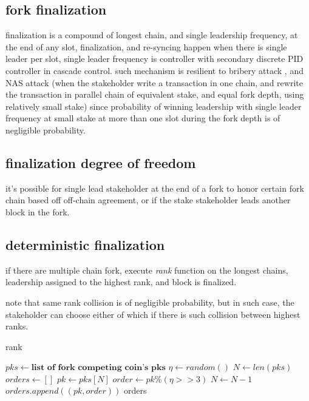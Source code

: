 \documentclass{article}
\begin{document}
\subsection{fork finalization}
finalization is a compound of longest chain, and single leadership frequency, at the end of any slot, finalization, and re-syncing happen when there is single leader per slot, single leader frequency is controller with secondary discrete PID controller in cascade control.
such mechanism is resilient to bribery attack \cite{attack_bribery}, and NAS attack (when the stakeholder write a transaction in one chain, and rewrite the transaction in parallel chain of equivalent stake, and equal fork depth, using relatively small stake) since probability of winning leadership with single leader frequency at small stake at more than one slot during the fork depth  is of negligible probability.

\subsection {finalization degree of freedom}
it's possible for single lead stakeholder at the end of a fork to honor certain fork chain based off off-chain agreement, or if the stake stakeholder leads another block in the fork.

\label{finalization}
\subsection {deterministic finalization}
if there are multiple chain fork, execute \emph{rank} function on the longest chains, leadership assigned to the highest rank, and block is finalized.

note that same rank collision is of negligible probability, but in such case, the stakeholder can choose either of which if there is such collision between highest ranks.


\begin{algorithm}
\caption{rank}\label{alg:cap}
\begin{algorithmic}

\State $pks \gets \textbf{list of fork competing coin's pks}$
\State $\eta \gets random()$ 
\State $N \gets len(pks)$
\State $orders \gets []$
\State $pk \gets pks[N]$
\State $order \gets pk \% (\eta >> 3) $
\State $N \gets N-1$
\State $orders.append((pk,order))$
\EndWhile
\State \Return orders
\end{algorithmic}
\end{algorithm}
\end{document}
